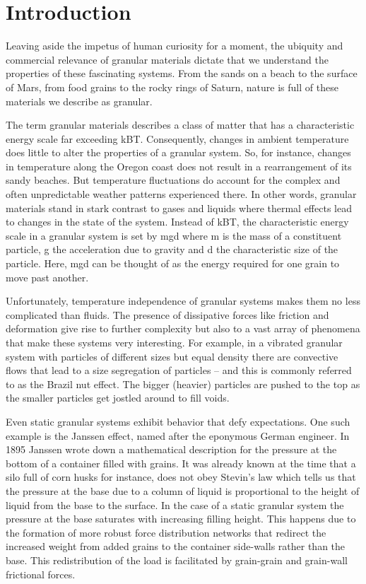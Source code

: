 \chapter{Introduction}

Leaving aside the impetus of human curiosity for a moment, the ubiquity and commercial relevance of granular materials dictate that we understand the properties of these fascinating systems. From the sands on a beach to the surface of Mars, from food grains to the rocky rings of Saturn, nature is full of these materials we describe as granular. 

The term granular materials describes a class of matter that has a characteristic energy scale far exceeding kBT. Consequently, changes in ambient temperature does little to alter the properties of a granular system. So, for instance, changes in temperature along the Oregon coast does not result in a rearrangement of its sandy beaches. But temperature fluctuations do account for the complex and often unpredictable weather patterns experienced there. In other words, granular materials stand in stark contrast to gases and liquids where thermal effects lead to changes in the state of the system. Instead of kBT, the characteristic energy scale in a granular system is set by mgd where m is the mass of a constituent particle, g the acceleration due to gravity and d the characteristic size of the particle. Here, mgd can be thought of as the energy required for one grain to move past another. 

Unfortunately, temperature independence of granular systems makes them no less complicated than fluids. The presence of dissipative forces like friction and deformation give rise to further complexity but also to a vast array of phenomena that make these systems very interesting. For example, in a vibrated granular system with particles of different sizes but equal density there are convective flows that lead to a size segregation of particles – and this is commonly referred to as the Brazil nut effect. The bigger (heavier) particles are pushed to the top as the smaller particles get jostled around to fill voids. 

Even static granular systems exhibit behavior that defy expectations. One such example is the Janssen effect, named after the eponymous German engineer. In 1895 Janssen wrote down a mathematical description for the pressure at the bottom of a container filled with grains. It was already known at the time that a silo full of corn husks for instance, does not obey Stevin’s law which tells us that the pressure at the base due to a column of liquid is proportional to the height of liquid from the base to the surface. In the case of a static granular system the pressure at the base saturates with increasing filling height. This happens due to the formation of more robust force distribution networks that redirect the increased weight from added grains to the container side-walls rather than the base. This redistribution of the load is facilitated by grain-grain and grain-wall frictional forces. 

